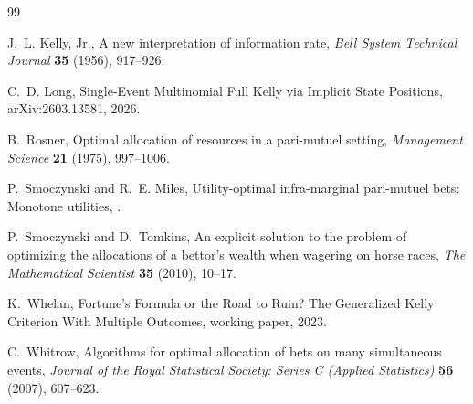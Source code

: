 \documentclass[11pt]{article}
\begin{document}
\begin{thebibliography}{99}

J.~L. Kelly, Jr.,
\newblock A new interpretation of information rate,
\newblock \emph{Bell System Technical Journal} \textbf{35} (1956), 917--926.

C.~D. Long,
\newblock Single-Event Multinomial Full Kelly via Implicit State Positions,
\newblock arXiv:2603.13581, 2026.

B.~Rosner,
\newblock Optimal allocation of resources in a pari-mutuel setting,
\newblock \emph{Management Science} \textbf{21} (1975), 997--1006.

P.~Smoczynski and R.~E. Miles,
\newblock Utility-optimal infra-marginal pari-mutuel bets: Monotone utilities,
.

P.~Smoczynski and D.~Tomkins,
\newblock An explicit solution to the problem of optimizing the allocations of a bettor's wealth when wagering on horse races,
\newblock \emph{The Mathematical Scientist} \textbf{35} (2010), 10--17.

K.~Whelan,
\newblock Fortune's Formula or the Road to Ruin? The Generalized Kelly Criterion With Multiple Outcomes,
\newblock working paper, 2023.

C.~Whitrow,
\newblock Algorithms for optimal allocation of bets on many simultaneous events,
\newblock \emph{Journal of the Royal Statistical Society: Series C (Applied Statistics)} \textbf{56} (2007), 607--623.

\end{thebibliography}
\end{document}
